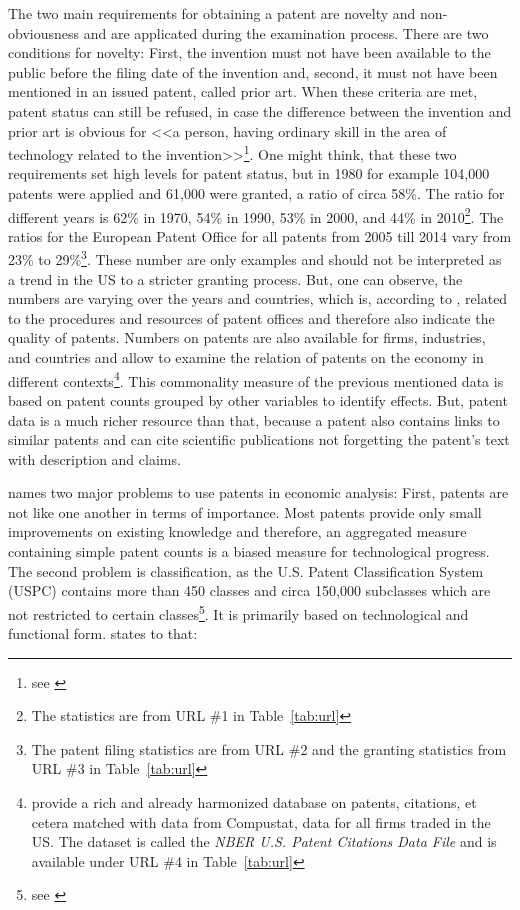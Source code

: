 \documentclass[12pt, a4paper, abstract, parskip]{scrartcl}
\theoremstyle{definition}
\begin{document}
The two main requirements for obtaining a patent are novelty and
non-obviousness and are applicated during the examination process. There are
two conditions for novelty: First, the invention must not have been available
to the public before the filing date of the invention and, second, it must not
have been mentioned in an issued patent, called prior art. When these criteria
are met, patent status can still be refused, in case the difference between the
invention and prior art is obvious for <<a person, having ordinary skill in the
area of technology related to the invention>>\footnote{see
\cite{uspto2014patents}}. One might think, that these two requirements set high
levels for patent status, but in 1980 for example 104,000 patents were applied
and 61,000 were granted, a ratio of circa 58\%. The ratio for different years
is 62\% in 1970, 54\% in 1990, 53\% in 2000, and 44\% in 2010\footnote{The
statistics are from URL \#1 in Table~\ref{tab:url}}. The ratios for the
European Patent Office for all patents from 2005 till 2014 vary from 23\% to
29\%\footnote{The patent filing statistics are from URL \#2 and the granting
statistics from URL \#3 in Table~\ref{tab:url}}. These number are only examples
and should not be interpreted as a trend in the US to a stricter granting
process. But, one can observe, the numbers are varying over the years and
countries, which is, according to \citet{griliches1990patent}, related to the
procedures and resources of patent offices and therefore also indicate the
quality of patents. Numbers on patents are also available for firms,
industries, and countries and allow to examine the relation of patents on the
economy in different contexts\footnote{\cite{hall2001nber} provide a rich and
already harmonized database on patents, citations, et cetera matched with data
from Compustat, data for all firms traded in the US. The dataset is called the
\textit{NBER U.S. Patent Citations Data File} and is available under URL \#4 in
Table~\ref{tab:url}}. This commonality measure of the previous mentioned data
is based on patent counts grouped by other variables to identify effects. But,
patent data is a much richer resource than that, because a patent also contains
links to similar patents and can cite scientific publications not forgetting
the patent's text with description and claims.

\citet{griliches1990patent} names two major problems to use patents in economic
analysis: First, patents are not like one another in terms of importance. Most
patents provide only small improvements on existing knowledge and therefore, an
aggregated measure containing simple patent counts is a biased measure for
technological progress. The second problem is classification, as the U.S.
Patent Classification System (USPC) contains more than 450 classes and circa
150,000 subclasses which are not restricted to certain classes\footnote{see
\citet{uspto2012}}. It is primarily based on technological and functional form.
\citeauthor{schmookler1966invention} states to that:
\end{document}
